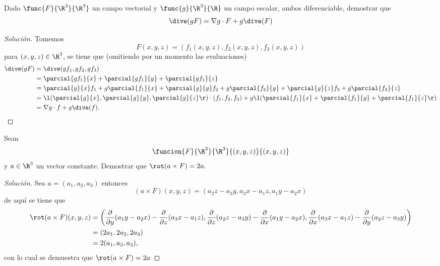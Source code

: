 \documentclass[a4,11pt]{aleph-notas}
\begin{document}
\encabezado

\begin{ejer}
Dado $\func{F}{\R^3}{\R^3}$ un campo vectorial y $\func{g}{\R^3}{\R}$ un campo escalar, ambos diferenciable, demostrar que
    \[
        \dive(gF) = \nabla g\cdot F + g\dive(F) 
    \]
\end{ejer}

\begin{proof}[Solución]
Tomemos 
    \[
        F(x,y,z) = (f_1(x,y,z),f_2(x,y,z),f_3(x,y,z)) 
    \]
    para $(x,y,z)\in\R^3$, se tiene que (omitiendo por un momento las evaluaciones)
    \begin{align*}
        \dive(gF) & = \dive(gf_1,gf_2,gf_3) \\
            & = \parcial{gf_1}{x} + \parcial{gf_1}{y} + \parcial{gf_1}{z} \\
            & = \parcial{g}{x} f_1 + g\parcial{f_1}{x} 
            + \parcial{g}{y} f_2 + g\parcial{f_2}{y} 
            + \parcial{g}{z} f_3 + g\parcial{f_3}{z} \\
            & = \l( \parcial{g}{x},\parcial{g}{y},\parcial{g}{z} \r) \cdot (f_1,f_2,f_3) + g\l(\parcial{f_1}{x} +\parcial{f_1}{y} +\parcial{f_1}{z} \r)\\
            & = \nabla g\cdot f + g\dive(f).
    \end{align*}
\end{proof}

\begin{ejer}
Sean
    \[
        \funcion{F}{\R^3}{\R^3}{(x,y,z)}{(x,y,z)}
    \]
    y $a \in \R^3$ un vector constante. Demostrar que $\rot(a \times F)=2a.$
\end{ejer}

\begin{proof}[Solución]
Sea $a=(a_1,a_2,a_3)$ entonces
    \[
        (a \times F){(x,y,z)}=(a_2z-a_3y ,a_3 x-a_1z, a_1y-a_2x)
    \]
    de aquí se tiene que 
    \begin{align*}
        \rot(a \times F)(x,y,z)
            &=\left( \frac{\partial}{\partial y} (a_1y-a_2x)-\frac{\partial}{\partial z}(a_3 x-a_1z),\frac{\partial}{\partial z} (a_2z-a_3y)-\frac{\partial}{\partial x}(a_1y-a_2x),\frac{\partial}{\partial x} (a_3 x-a_1z)-\frac{\partial}{\partial y}(a_2z-a_3y) \right)\\
            &=(2a_1,2a_2,2a_3)\\
            &=2(a_1,a_2,a_3),
    \end{align*}
    con lo cual se demuestra que $\rot(a \times F)=2a$
\end{proof}
\end{document}
